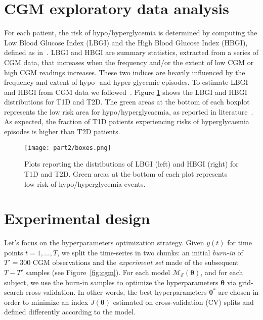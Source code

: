 \section{CGM exploratory data analysis}
For each patient, the risk of hypo/hyperglycemia is determined by computing the Low Blood Glucose Index (\ac{LBGI}) and the High Blood Glucose Index (\ac{HBGI}), defined as in~\cite{fabris2016risk}.
LBGI and HBGI are summary statistics, extracted from a series of CGM data, that increases when the frequency and/or the extent of low CGM or high CGM readings increases.
These two indices are heavily influenced by the frequency and extent of hypo- and hyper-glycemic episodes.
To estimate LBGI and HBGI from CGM data we followed~\cite{kovatchev1997symmetrization}.
Figure \ref{fig:plots} shows the LBGI and HBGI distributions for T1D and T2D. The green areas at the bottom of each boxplot represents the low risk area for hypo/hyperglycaemia, as reported in literature~\cite{kovatchev1997symmetrization}.
As expected, the fraction of T1D patients experiencing risks of hyperglycaemia episodes is higher than T2D patients.

\begin{figure}[]
	\caption{Plots reporting the distributions of LBGI (left) and HBGI (right) for T1D and T2D. Green areas at the bottom of each plot represents low risk of hypo/hyperglycemia events.
	}\label{fig:plots}
	\centering
	\texttt{[image: part2/boxes.png]}
\end{figure}

\section{Experimental design} \label{sec:diabete_expdesign}

Let's focus on the hyperparameters optimization strategy.
Given $y(t)$ for time points $t=1,\dots,T$, we split the time-series in two chunks: an initial {\em burn-in} of $T' = 300$ CGM observations and the {\em experiment set} made of the subsequent $T - T'$ samples (see Figure~\ref{fig:cgm}). For each model $\mathcal{M}_\mathcal{S}(\bm{\theta})$, and for each subject, we use the burn-in samples to optimize the hyperparameters $\bm{\theta}$ via grid-search cross-validation. In other words, the best hyperparameters $\bm{\theta}^*$  are chosen in order to minimize an index $J(\bm{\theta})$ estimated on cross-validation (CV) splits and defined differently according to the model. %

